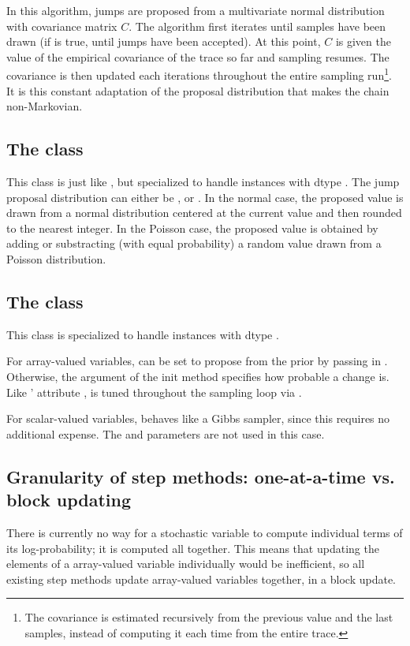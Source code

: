 \documentclass[]{jss}
\begin{document}
In this algorithm, jumps are proposed from a multivariate normal
distribution with covariance matrix $C$. The algorithm first iterates
until  samples have been drawn (if  is true, until
 jumps have been accepted). At this point, $C$ is given
the value of the empirical covariance of the trace so far and sampling
resumes. The covariance is then updated each 
iterations throughout the entire sampling run\footnote{The covariance is
estimated recursively from the previous value and the last 
samples, instead of computing it each time from the entire trace.}. It is
this constant adaptation of the proposal distribution that makes the chain
non-Markovian.

\subsection[The DiscreteMetropolis class]{The
 class}
This class is just like , but specialized to handle
 instances with dtype . The jump proposal
distribution can either be ,  or .
In the normal case, the proposed value is drawn from a normal distribution
centered at the current value and then rounded to the
nearest integer. In the Poisson case, the proposed value is obtained by adding
or substracting (with equal probability) a random value drawn from a Poisson
distribution.

\subsection[The BinaryMetropolis class]{The
 class}
This class is specialized to handle  instances with dtype
.

For array-valued variables,  can be set to propose from
the prior by passing in . Otherwise, the argument
 of the init method specifies how probable a change is. Like
' attribute ,  is tuned
throughout the sampling loop via .

For scalar-valued variables,  behaves like a Gibbs
sampler, since this requires no additional expense. The  and
 parameters are not used in this case.

\subsection{Granularity of step methods: one-at-a-time vs. block updating}
\label{subsec:granularity}
There is currently no way for a stochastic variable to compute individual terms of its log-probability; it is computed all together. This means that updating the elements of a array-valued variable individually would be inefficient, so all existing step methods update array-valued variables together, in a block update.
\end{document}
